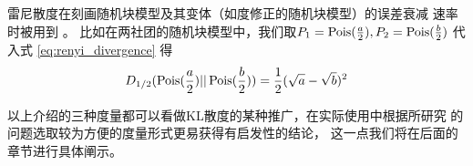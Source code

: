 雷尼散度在刻画随机块模型及其变体（如度修正的随机块模型）的误差衰减
速率时被用到 \cite{zhang2016, gao2018community}。
比如在两社团的随机块模型中，我们取$P_1=\operatorname{Pois}(\frac{a}{2}),P_2=\operatorname{Pois}(\frac{b}{2})$
代入式 \eqref{eq:renyi_divergence} 
得
\begin{equation}\label{eq:renyi_d12_ab}
  D_{1/2}(\operatorname{Pois}(\frac{a}{2}) || \operatorname{Pois}(\frac{b}{2}))
  = \frac{1}{2}(\sqrt{a} - \sqrt{b})^2
\end{equation}

以上介绍的三种度量都可以看做KL散度的某种推广，在实际使用中根据所研究
的问题选取较为方便的度量形式更易获得有启发性的结论，
这一点我们将在后面的章节进行具体阐示。
